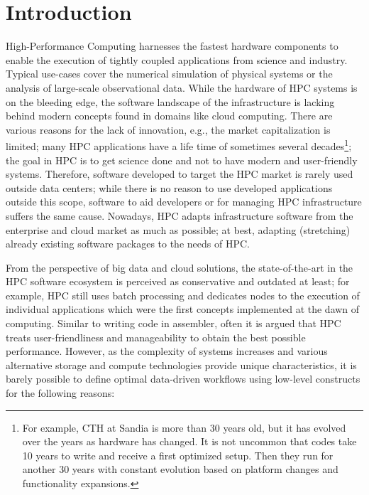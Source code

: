 \documentclass[a4paper, twocolumn]{article}
\begin{document}
\section{Introduction}

High-Performance Computing harnesses the fastest hardware components to enable
the execution of tightly coupled applications from science and industry.
Typical use-cases cover the numerical simulation of physical systems or the analysis of large-scale observational data.
While the hardware of HPC systems is on the bleeding edge, the software landscape of the infrastructure is lacking behind modern concepts found in domains like cloud computing.
There are various reasons for the lack of innovation, e.g., the market capitalization is limited; many HPC applications have a life time of sometimes several decades\footnote{For example, CTH at Sandia is more than 30 years old, but it has evolved over the years as hardware has changed.
It is not uncommon that codes take 10 years to write and receive a first optimized setup.
Then they run for another 30 years with constant evolution based on platform changes and functionality expansions.}; the goal in HPC is to get science done and not to have modern and user-friendly systems.
Therefore, software developed to target the HPC market is rarely used outside data centers; while there is no reason to use developed applications outside this scope, software to aid developers or for managing HPC infrastructure suffers the same cause.
Nowadays, HPC adapts infrastructure software from the enterprise and cloud market as much as possible; at best, adapting (stretching) already existing software packages to the needs of HPC.

From the perspective of big data and cloud solutions, the state-of-the-art in the HPC software ecosystem is perceived as conservative and outdated at least; for example, HPC still uses batch processing and dedicates nodes to the execution of individual applications which were the first concepts implemented at the dawn of computing.
Similar to writing code in assembler, often it is argued that HPC treats user-friendliness and manageability to obtain the best possible performance.
However, as the complexity of systems increases and various alternative storage and compute technologies provide unique characteristics, it is barely possible to define optimal data-driven workflows using low-level constructs for the following reasons:
\end{document}
